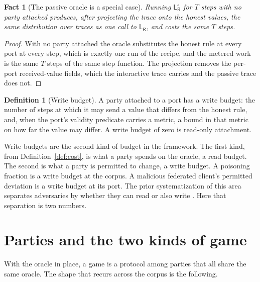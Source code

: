 \documentclass[11pt]{article}
\theoremstyle{definition}
\newtheorem{definition}{Definition}
\theoremstyle{plain}
\newtheorem{fact}{Fact}
\theoremstyle{remark}
\newcommand{\Lo}{\mathsf{L}}
\newcommand{\Rec}{\mathsf{R}}
\begin{document}
\begin{fact}[The passive oracle is a special case]
Running $\Lo^{\circ}_{\Rec}$ for $T$ steps with no party attached produces, after
projecting the trace onto the honest values, the same distribution over traces
as one call to $\Lo_{\Rec}$, and costs the same $T$ steps.
\end{fact}

\begin{proof}
With no party attached the oracle substitutes the honest rule at every port at
every step, which is exactly one run of the recipe, and the metered work is the
same $T$ steps of the same step function. The projection removes the per-port
received-value fields, which the interactive trace carries and the passive
trace does not.
\end{proof}

\begin{definition}[Write budget]
\label{def:write}
A party attached to a port has a write budget: the number of steps at which it may
send a value that differs from the honest rule, and, when the port's validity
predicate carries a metric, a bound in that metric on how far the value may
differ. A write budget of zero is read-only
attachment.
\end{definition}

Write budgets are the second kind of budget in the framework. The first kind, from
Definition~\ref{def:cost}, is what a party spends on the oracle, a read budget. The
second is what a party is permitted to change, a write budget. A poisoning fraction
is a write budget at the corpus. A malicious federated client's permitted deviation
is a write budget at its port. The prior systematization of this area separates
adversaries by whether they can read or also write \cite{PMSW18}. Here that
separation is two numbers.

\section{Parties and the two kinds of game}
\label{sec:games}

With the oracle in place, a game is a protocol among parties that all share the
same oracle. The shape that recurs across the corpus is the following.
\end{document}
